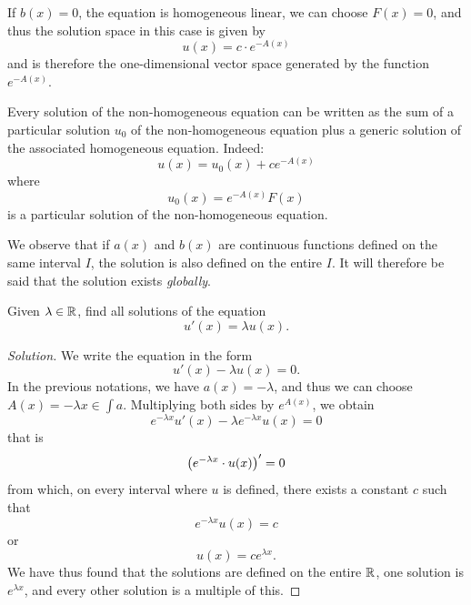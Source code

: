 If $b(x)=0$, the equation is homogeneous linear, we can choose $F(x) = 0$, and
thus the solution space in this case is given by
\[
  u(x) = c \cdot e^{-A(x)}
\]
and is therefore the one-dimensional vector space generated by the function
$e^{-A(x)}$.

Every solution of the non-homogeneous equation can be written as the sum of a
particular solution $u_0$ of the non-homogeneous equation plus a generic
solution of the associated homogeneous equation. Indeed:
\[
  u(x) = u_0(x) + c e^{-A(x)}
\]
where
\[
  u_0(x) = e^{-A(x)}F(x)
\]
is a particular solution of the non-homogeneous equation.

We observe that if $a(x)$ and $b(x)$ are continuous functions defined on the
same interval $I$, the solution is also defined on the entire $I$. It will
therefore be said that the solution exists \emph{globally}.

\begin{exercise}%
  \label{ex:58230978}
Given $\lambda \in {\mathbb R}$, find all solutions of the equation
\[
  u'(x) = \lambda u(x).
\]
\end{exercise}
%
\begin{proof}[Solution]
We write the equation in the form
\[
  u'(x) - \lambda u(x) = 0.
\]
In the previous notations, we have $a(x) = -\lambda$, and thus we can choose
$A(x) = -\lambda x \in \int a$.
Multiplying both sides by $e^{A(x)}$, we obtain
\[
  e^{-\lambda x} u'(x) - \lambda e^{-\lambda x} u(x) = 0
\]
that is
\[
 {\left( e^{-\lambda x}\cdot u(x) \right)}' = 0
\]
from which, on every interval where $u$ is defined, there exists a constant $c$
such that
\[
  e^{-\lambda x} u(x) = c
\]
or
\[
  u(x) = c e^{\lambda x}.
\]
We have thus found that the solutions are defined on the entire ${\mathbb R}$, one
solution is $e^{\lambda x}$, and every other solution is a multiple of this.
\end{proof}

